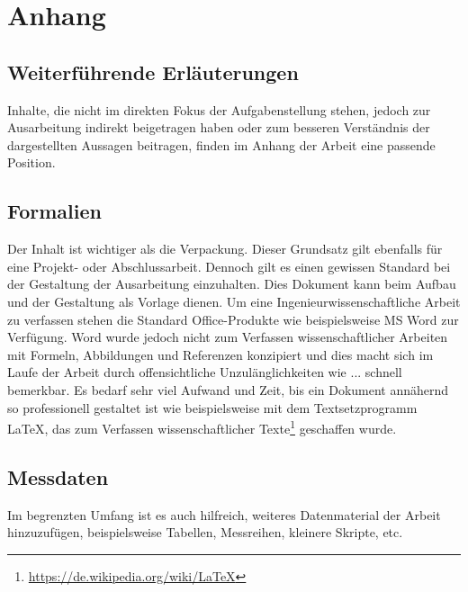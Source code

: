 
\chapter{Anhang}

\section{Weiterführende Erläuterungen}

Inhalte, die nicht im direkten Fokus der Aufgabenstellung stehen, jedoch zur Ausarbeitung indirekt beigetragen haben oder zum besseren Verständnis der dargestellten Aussagen beitragen, finden im Anhang der Arbeit eine passende Position.

\section{Formalien}

Der Inhalt ist wichtiger als die Verpackung. Dieser Grundsatz gilt ebenfalls für eine Projekt- oder Abschlussarbeit. Dennoch gilt es einen gewissen Standard bei der Gestaltung der Ausarbeitung einzuhalten. Dies Dokument kann beim Aufbau und der Gestaltung als Vorlage dienen. Um eine Ingenieurwissenschaftliche Arbeit zu verfassen stehen die Standard Office-Produkte wie beispielsweise MS Word zur Verfügung. Word wurde jedoch nicht zum Verfassen wissenschaftlicher Arbeiten mit Formeln, Abbildungen und Referenzen konzipiert und dies macht sich im Laufe der Arbeit durch offensichtliche Unzulänglichkeiten wie ... schnell bemerkbar. Es bedarf sehr viel Aufwand und Zeit, bis ein Dokument annähernd so professionell gestaltet ist wie beispielsweise mit dem Textsetzprogramm \LaTeX, das zum Verfassen wissenschaftlicher Texte\footnote{\url{https://de.wikipedia.org/wiki/LaTeX}} geschaffen wurde. 

\section{Messdaten}

Im begrenzten Umfang ist es auch hilfreich, weiteres Datenmaterial der Arbeit hinzuzufügen, beispielsweise Tabellen, Messreihen, kleinere Skripte, etc.
